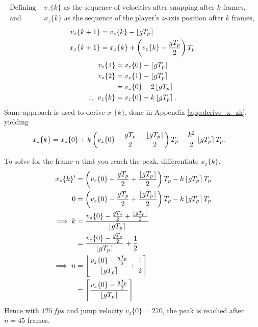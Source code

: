 \begin{align*}
\text{Defining }&v_z\{k\}\text{ as the sequence of velocities after snapping after }k\text{ frames},\\
\text{and }&x_z\{k\}\text{ as the sequence of the player's }z\text{-axis position after }k\text{ frames},
\end{align*}
\begin{align}
\label{eq:v_zk+1}
v_z\{k+1\} &= v_z\{k\} - \left\lfloor gT_p\right\rceil\\
\label{eq:x_zk+1}
x_z\{k+1\} &= x_z\{k\} + \left(v_z\{k\} - \frac{gT_p}{2} \right) T_p
\end{align}
\begin{align}
\nonumber
v_z\{1\} &= v_z\{0\} - \left\lfloor gT_p\right\rceil\\\nonumber
v_z\{2\} &= v_z\{1\} - \left\lfloor gT_p\right\rceil\\\nonumber
&= v_z\{0\} - 2\left\lfloor gT_p\right\rceil\\
\label{eq:v_zk}
\therefore\ v_z\{k\} &= v_z\{0\} - k\left\lfloor gT_p\right\rceil.
\end{align}
Same approach is used to derive $x_z\{k\}$, done in Appendix \ref{app:derive_x_zk}, yielding
\begin{align}
\label{eq:x_zk}
x_z\{k\} &= x_z\{0\} + k\left(v_z\{0\} - \frac{gT_p}{2} + \frac{\left\lfloor gT_p\right\rceil}{2} \right) T_p - \frac{k^2}{2} \left\lfloor gT_p\right\rceil T_p.
\end{align}

To solve for the frame $n$ that you reach the peak, differentiate $x_z\{k\}$.
\begin{align*}
x_z\{k\}' &= \left(v_z\{0\} - \frac{gT_p}{2} + \frac{\left\lfloor gT_p\right\rceil}{2} \right) T_p - k\left\lfloor gT_p\right\rceil T_p\\
0 &= \left(v_z\{0\} - \frac{gT_p}{2} + \frac{\left\lfloor gT_p\right\rceil}{2} \right) T_p - k\left\lfloor gT_p\right\rceil T_p\\
\implies k &= \frac{v_z\{0\} - \frac{gT_p}{2} + \frac{\left\lfloor gT_p\right\rceil}{2}}{\left\lfloor gT_p\right\rceil}\\
&= \frac{v_z\{0\} - \frac{gT_p}{2}}{\left\lfloor gT_p\right\rceil} + \frac{1}{2}\\
\implies n &= \left\lfloor\frac{v_z\{0\} - \frac{gT_p}{2}}{\left\lfloor gT_p\right\rceil} + \frac{1}{2}\right\rceil\\
&= \left\lceil\frac{v_z\{0\} - \frac{gT_p}{2}}{\left\lfloor gT_p\right\rceil}\right\rceil
\end{align*}
Hence with $\qty{125}{fps}$ and jump velocity $v_z\{0\} = 270$, the peak is reached after $n = 45$ frames.\\

